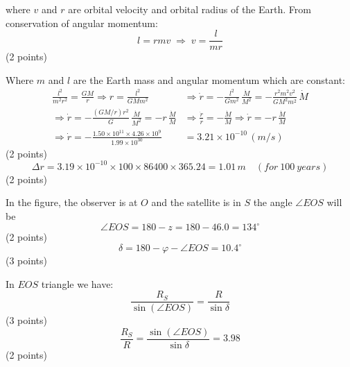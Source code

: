 where $v$ and $r$ are orbital velocity and orbital radius of the Earth.
From conservation of angular momentum:
\[
  l = rmv \;\Longrightarrow\; v = \frac{l}{mr}
\]
\hfill(2 points)

Where $m$ and $l$ are the Earth mass and angular momentum which are constant:
\begin{align*}
  \frac{l^2}{m^2r^2} = \frac{GM}{r}
  \Rightarrow r = \frac{l^2}{GMm^2}
  &\Rightarrow \dot{r} = -\frac{l^2}{Gm^2}\,\frac{\dot{M}}{M^2}
   = -\frac{r^2m^2v^2}{GM^2m^2}\,\dot{M} \\
  \Rightarrow \dot{r} = -\frac{(GM/r)r^2}{G}\,\frac{\dot{M}}{M^2}
   = -r\,\frac{\dot{M}}{M}
  &\Rightarrow \frac{\dot{r}}{r} = -\frac{\dot{M}}{M}
   \Rightarrow \dot{r} = -r\,\frac{\dot{M}}{M} \\
  \Rightarrow \dot{r}
   = -\frac{1.50\times 10^{11}\times 4.26\times 10^{9}}{1.99\times 10^{30}}
  &= 3.21\times 10^{-10}\,(m/s)
\end{align*}
\hfill(2 points)
\[
  \Delta r = 3.19\times 10^{-10}\times 100\times 86400\times 365.24
  = 1.01\,m \quad (for\ 100\ years)
\]
\hfill(2 points)

In the figure, the observer is at $O$ and the satellite is in $S$ the angle
$\angle EOS$ will be
\[
  \angle EOS = 180 - z = 180 - 46.0 = 134^\circ
\]
\hfill(2 points)
\[
  \delta = 180 - \varphi - \angle EOS = 10.4^\circ
\]
\hfill(3 points)

In $EOS$ triangle we have:
\[
  \frac{R_S}{\sin(\angle EOS)} = \frac{R}{\sin\delta}
\]
\hfill(3 points)
\[
  \frac{R_S}{R} = \frac{\sin(\angle EOS)}{\sin\delta} = 3.98
\]
\hfill(2 points)

